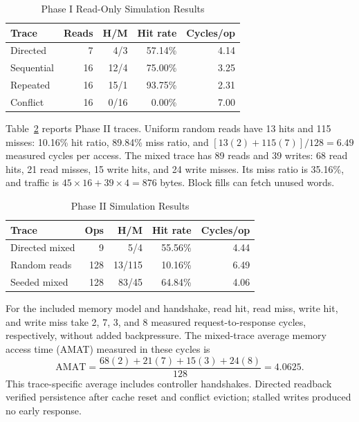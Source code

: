 \documentclass[conference]{IEEEtran}
\begin{document}
\begin{table}[t]
\caption{Phase I Read-Only Simulation Results}
\label{tab:p1results}
\centering\footnotesize
\begin{tabular}{lrrrr}
\hline
Trace & Reads & H/M & Hit rate & Cycles/op\\\hline
Directed & 7 & 4/3 & 57.14\% & 4.14\\
Sequential & 16 & 12/4 & 75.00\% & 3.25\\
Repeated & 16 & 15/1 & 93.75\% & 2.31\\
Conflict & 16 & 0/16 & 0.00\% & 7.00\\\hline
\end{tabular}
\end{table}

Table~\ref{tab:p2results} reports Phase II traces. Uniform random reads have 13 hits and 115 misses: 10.16\% hit ratio, 89.84\% miss ratio, and $[13(2)+115(7)]/128=6.49$ measured cycles per access. The mixed trace has 89 reads and 39 writes: 68 read hits, 21 read misses, 15 write hits, and 24 write misses. Its miss ratio is 35.16\%, and traffic is $45\times16+39\times4=876$ bytes. Block fills can fetch unused words.

\begin{table}[t]
\caption{Phase II Simulation Results}
\label{tab:p2results}
\centering\footnotesize
\begin{tabular}{lrrrr}
\hline
Trace & Ops & H/M & Hit rate & Cycles/op\\\hline
Directed mixed & 9 & 5/4 & 55.56\% & 4.44\\
Random reads & 128 & 13/115 & 10.16\% & 6.49\\
Seeded mixed & 128 & 83/45 & 64.84\% & 4.06\\\hline
\end{tabular}
\end{table}

For the included memory model and handshake, read hit, read miss, write hit, and write miss take 2, 7, 3, and 8 measured request-to-response cycles, respectively, without added backpressure. The mixed-trace average memory access time (AMAT) measured in these cycles is
\begin{equation}
\mathrm{AMAT}=\frac{68(2)+21(7)+15(3)+24(8)}{128}=4.0625.
\end{equation}
This trace-specific average includes controller handshakes. Directed readback verified persistence after cache reset and conflict eviction; stalled writes produced no early response.
\end{document}
